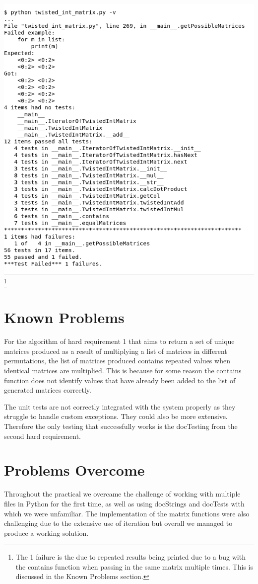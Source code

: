 \documentclass[11]{article}
\begin{document}
			\includegraphics[scale=0.5]{Test2.png} \footnote{The 1 failure is the due to repeated results being printed due to a bug with the contains function when passing in the same matrix multiple times. This is discussed in the Known Problems section.}
		
	\section{Known Problems}
		For the algorithm of hard requirement 1 that aims to return a set of unique matrices produced as a result of multiplying a list of matrices in different permutations, the list of matrices produced contains repeated values when identical matrices are multiplied. This is because for some reason the contains function does not identify values that have already been added to the list of generated matrices correctly.
		
The unit tests are not correctly integrated with the system properly as they struggle to handle custom exceptions. They could also be more extensive. Therefore the only testing that successfully works is the docTesting from the second hard requirement.
		
	\section{Problems Overcome}
	Throughout the practical we overcame the challenge of working with multiple files in Python for the first time, as well as using docStrings and docTests with which we were unfamiliar. The implementation of the matrix functions were also challenging due to the extensive use of iteration but overall we managed to produce a working solution.
\end{document}
